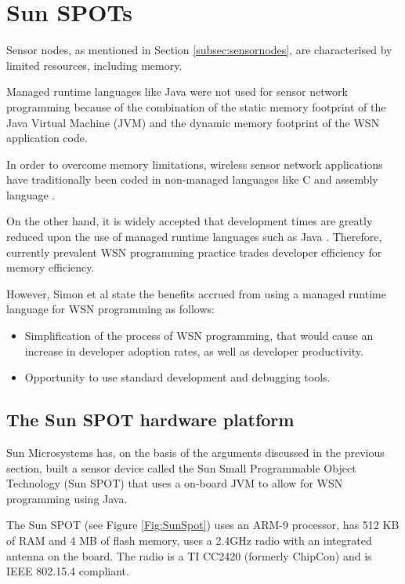 \section {Sun SPOTs} \label{sec:sunspots}

Sensor nodes, as mentioned in Section \ref{subsec:sensornodes}, are
characterised by limited resources, including memory.
 
Managed runtime languages like Java were not used for sensor network programming
because of the combination of the static memory footprint of the Java Virtual
Machine (JVM) and the dynamic memory footprint of the WSN application code.

In order to overcome
memory limitations, wireless sensor network applications have traditionally been
 coded in non-managed languages like C and assembly language
 \cite{simon_squawk:2006}. 
 
 On the other hand, it is widely accepted that development times are greatly reduced
upon the use of managed runtime languages such as Java
\cite{simon_squawk:2006}. Therefore, currently prevalent WSN programming practice
trades developer efficiency for memory efficiency. 

However, Simon et al \cite{simon_squawk:2006} state the benefits accrued from
using a managed runtime language for WSN programming as follows:

\begin{itemize}
  \item Simplification of the process of WSN programming, that would cause an
  increase in developer adoption rates, as well as developer productivity.
  \item Opportunity to use standard development and debugging tools.
\end{itemize}
 
\subsection{The Sun SPOT hardware platform }
Sun Microsystems has, on the basis of the arguments discussed in the previous
section, built a sensor device
called the Sun Small Programmable Object Technology (Sun SPOT) that uses a
on-board JVM to allow for WSN programming using Java.

The Sun SPOT (see Figure \ref{Fig:SunSpot}) uses an ARM-9 processor, has 512 KB of RAM
and 4 MB of flash memory, uses a 2.4GHz radio with an integrated antenna on the board. The radio
is a TI CC2420 (formerly ChipCon) and is IEEE 802.15.4 compliant.


